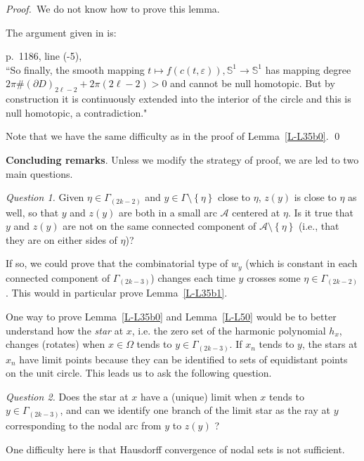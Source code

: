 \documentclass[12pt,a4paper]{amsart}
\theoremstyle{plain} %
\theoremstyle{definition}
\numberwithin{equation}{section}
\numberwithin{figure}{section}
\numberwithin{table}{section}
\newcommand{\bS}{\mathbb{S}}
\newcommand{\cA}{\mathcal{A}}
\newcommand{\pf}{\emph{Proof.~}}
\newcommand{\sm}{\!\setminus\!}
\newcommand{\set}[1]{\left\lbrace #1 \right\rbrace}
\newcommand{\noi}{\noindent}
\begin{document}
\pf We do not know how to prove this lemma. \smallskip

 The argument given in \cite[p.~1186]{HoMN1999} is:\smallskip

p.~1186, line (-5),\\ ``So finally, the smooth mapping $t \mapsto f(c(t,\varepsilon)), \bS^1 \to \bS^1$ has mapping degree $2\pi \#(\partial D)_{2\ell - 2} + 2\pi (2\ell -2) > 0$ and cannot be null homotopic. But by construction it is continuously extended into the interior of the circle and this is null homotopic, a contradiction."\smallskip

Note that we have the same difficulty as in the proof of Lemma~\ref{L-L35b0}.
\hfill \qed

\vspace{1cm}

\textbf{Concluding remarks}. Unless we modify the strategy of proof, we are led to two main questions.\medskip

\noi \emph{Question 1.} Given $\eta \in \Gamma_{(2k-2)}$ and $y \in \Gamma \sm \set{\eta}$ close to $\eta$, $z(y)$ is close to $\eta$ as well, so that $y$ and $z(y)$ are both in a small arc $\cA$ centered at $\eta$. Is it true that $y$ and $z(y)$ are not on the same connected component of $\cA \sm \set{\eta}$ (i.e., that they are on either sides of $\eta$)?\smallskip

If so, we could prove that the combinatorial type of $w_y$ (which is constant in each connected component of $\Gamma_{(2k-3)}$) changes each time $y$ crosses some $\eta \in \Gamma_{(2k-2)}$. This would in particular prove Lemma~\ref{L-L35b1}. \medskip

One way to prove Lemma~\ref{L-L35b0} and Lemma~\ref{L-L50} would be to better understand how the \emph{star} at $x$, i.e. the zero set of the harmonic polynomial $h_x$, changes (rotates) when $x \in \Omega$ tends to $y \in \Gamma_{(2k-3)}$. If $x_n$ tends to $y$, the stars at $x_n$ have limit points because they can be identified to sets of equidistant points on the unit circle.  This leads us to ask the following question.  \smallskip

\noi \emph{Question 2.} Does the star at $x$ have a (unique) limit when $x$ tends to $y \in \Gamma_{(2k-3)}$, and can we identify one branch of the limit star as the ray at $y$ corresponding to the nodal arc from $y$ to $z(y)$ ? \smallskip

One difficulty here is that Hausdorff convergence of nodal sets is not sufficient.
\end{document}
